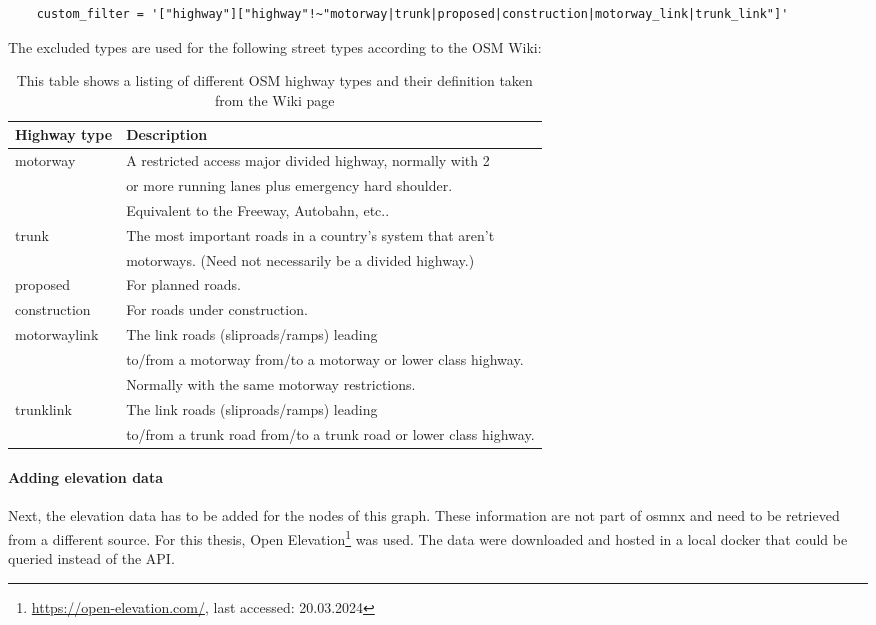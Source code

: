 \begin{lstlisting}
	custom_filter = '["highway"]["highway"!~"motorway|trunk|proposed|construction|motorway_link|trunk_link"]'
\end{lstlisting}

The excluded types are used for the following street types according to the OSM Wiki:
\begin{table}[ht]
	\centering
	\begin{tabular}{l|l}
		Highway type & Description\\
		\hline
		motorway & A restricted access major divided highway, normally with 2\\ 
		& or more running lanes plus emergency hard shoulder.\\
		& Equivalent to the Freeway, Autobahn, etc..  \\
		trunk & The most important roads in a country's system that aren't \\
		& motorways. (Need not necessarily be a divided highway.) \\
		proposed & For planned roads. \\
		construction & For roads under construction. \\
		motorway\textunderscore link & The link roads (sliproads/ramps) leading\\
		& to/from a motorway from/to a motorway or lower class highway. \\
		& Normally with the same motorway restrictions. \\
		trunk\textunderscore link & The link roads (sliproads/ramps) leading \\
		& to/from a trunk road from/to a trunk road or lower class highway. 
	\end{tabular}
	\caption[OSM highway types]{This table shows a listing of different OSM highway types and their definition taken from the Wiki page\protect\footnotemark}
	\label{tab:osmHighwayTypes}
\end{table}



\paragraph{Adding elevation data}

Next, the elevation data has to be added for the nodes of this graph.
These information are not part of osmnx and need to be retrieved from a different source.
For this thesis, Open Elevation\footnote{\url{https://open-elevation.com/}, last accessed: 20.03.2024} was used.
The data were downloaded and hosted in a local docker that could be queried instead of the API.

